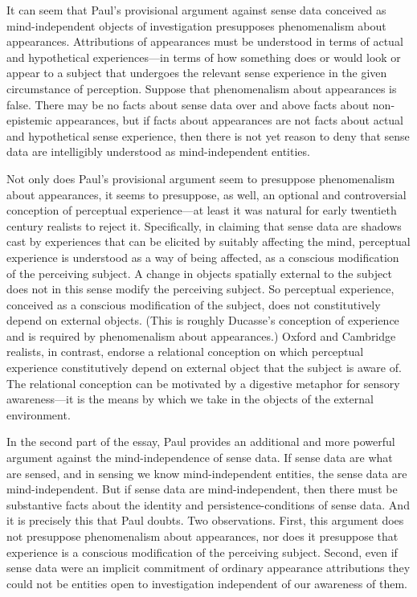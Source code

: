 \documentclass[11pt]{article}
\begin{document}
\begin{discussion}
    It can seem that Paul's provisional argument against sense data conceived as mind-independent objects of investigation presupposes phenomenalism about appearances. Attributions of appearances must be understood in terms of actual and hypothetical experiences---in terms of how something does or would look or appear to a subject that undergoes the relevant sense experience in the given circumstance of perception. Suppose that phenomenalism about appearances is false. There may be no facts about sense data over and above facts about non-epistemic appearances, but if facts about appearances are not facts about actual and hypothetical sense experience, then there is not yet reason to deny that sense data are intelligibly understood as mind-independent entities.

    Not only does Paul's provisional argument seem to presuppose phenomenalism about appearances, it seems to presuppose, as well, an optional and controversial conception of perceptual experience---at least it was natural for early twentieth century realists to reject it. Specifically, in claiming that sense data are shadows cast by experiences that can be elicited by suitably affecting the mind, perceptual experience is understood as a way of being affected, as a conscious modification of the perceiving subject. A change in objects spatially external to the subject does not in this sense modify the perceiving subject. So perceptual experience, conceived as a conscious modification of the subject, does not constitutively depend on external objects. (This is roughly Ducasse's conception of experience and is required by phenomenalism about appearances.) Oxford and Cambridge realists, in contrast, endorse a relational conception on which perceptual experience constitutively depend on external object that the subject is aware of. The relational conception can be motivated by a digestive metaphor for sensory awareness---it is the means by which we take in the objects of the external environment.
    
    In the second part of the essay, Paul provides an additional and more powerful argument against the mind-independence of sense data. If sense data are what are sensed, and in sensing we know mind-independent entities, the sense data are mind-independent. But if sense data are mind-independent, then there must be substantive facts about the identity and persistence-conditions of sense data. And it is precisely this that Paul doubts. Two observations. First, this argument does not presuppose phenomenalism about appearances, nor does it presuppose that experience is a conscious modification of the perceiving subject. Second, even if sense data were an implicit commitment of ordinary appearance attributions they could not be entities open to investigation independent of our awareness of them.
\end{discussion}
\end{document}
